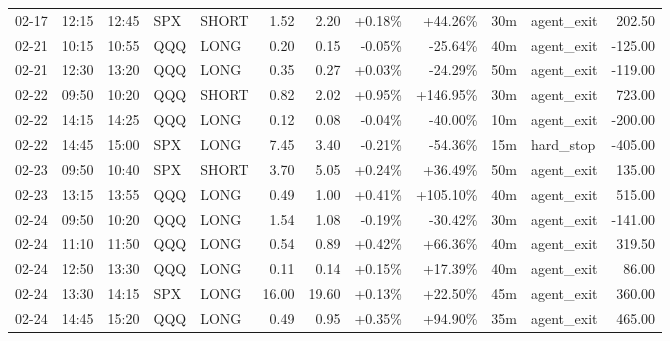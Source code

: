 \documentclass[11pt,a4paper,twoside]{article}
\begin{document}
\begin{center}
\begin{longtable}{>{\color{txtmain}}l l l l l r r r r r >{\color{txtmain}}l r}
02-17 & 12:15 & 12:45 & SPX & SHORT & 1.52 & 2.20 & \textcolor{wingreen}{+0.18\%} & \textcolor{wingreen}{+44.26\%} & 30m & agent\_exit & \textcolor{wingreen}{202.50} \\
02-21 & 10:15 & 10:55 & QQQ & LONG & 0.20 & 0.15 & \textcolor{lossred}{-0.05\%} & \textcolor{lossred}{-25.64\%} & 40m & agent\_exit & \textcolor{lossred}{-125.00} \\
02-21 & 12:30 & 13:20 & QQQ & LONG & 0.35 & 0.27 & \textcolor{wingreen}{+0.03\%} & \textcolor{lossred}{-24.29\%} & 50m & agent\_exit & \textcolor{lossred}{-119.00} \\
02-22 & 09:50 & 10:20 & QQQ & SHORT & 0.82 & 2.02 & \textcolor{wingreen}{+0.95\%} & \textcolor{wingreen}{+146.95\%} & 30m & agent\_exit & \textcolor{wingreen}{723.00} \\
02-22 & 14:15 & 14:25 & QQQ & LONG & 0.12 & 0.08 & \textcolor{lossred}{-0.04\%} & \textcolor{lossred}{-40.00\%} & 10m & agent\_exit & \textcolor{lossred}{-200.00} \\
02-22 & 14:45 & 15:00 & SPX & LONG & 7.45 & 3.40 & \textcolor{lossred}{-0.21\%} & \textcolor{lossred}{-54.36\%} & 15m & hard\_stop & \textcolor{lossred}{-405.00} \\
02-23 & 09:50 & 10:40 & SPX & SHORT & 3.70 & 5.05 & \textcolor{wingreen}{+0.24\%} & \textcolor{wingreen}{+36.49\%} & 50m & agent\_exit & \textcolor{wingreen}{135.00} \\
02-23 & 13:15 & 13:55 & QQQ & LONG & 0.49 & 1.00 & \textcolor{wingreen}{+0.41\%} & \textcolor{wingreen}{+105.10\%} & 40m & agent\_exit & \textcolor{wingreen}{515.00} \\
02-24 & 09:50 & 10:20 & QQQ & LONG & 1.54 & 1.08 & \textcolor{lossred}{-0.19\%} & \textcolor{lossred}{-30.42\%} & 30m & agent\_exit & \textcolor{lossred}{-141.00} \\
02-24 & 11:10 & 11:50 & QQQ & LONG & 0.54 & 0.89 & \textcolor{wingreen}{+0.42\%} & \textcolor{wingreen}{+66.36\%} & 40m & agent\_exit & \textcolor{wingreen}{319.50} \\
02-24 & 12:50 & 13:30 & QQQ & LONG & 0.11 & 0.14 & \textcolor{wingreen}{+0.15\%} & \textcolor{wingreen}{+17.39\%} & 40m & agent\_exit & \textcolor{wingreen}{86.00} \\
02-24 & 13:30 & 14:15 & SPX & LONG & 16.00 & 19.60 & \textcolor{wingreen}{+0.13\%} & \textcolor{wingreen}{+22.50\%} & 45m & agent\_exit & \textcolor{wingreen}{360.00} \\
02-24 & 14:45 & 15:20 & QQQ & LONG & 0.49 & 0.95 & \textcolor{wingreen}{+0.35\%} & \textcolor{wingreen}{+94.90\%} & 35m & agent\_exit & \textcolor{wingreen}{465.00} \\

\end{longtable}
\end{center}
\end{document}
